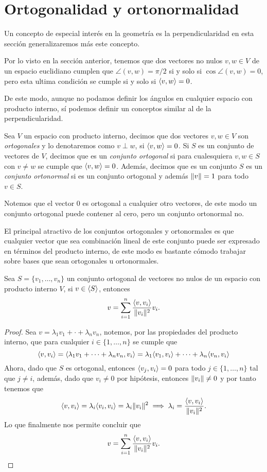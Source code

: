 \section{Ortogonalidad y ortonormalidad}

Un concepto de especial interés en la geometría es la perpendicularidad en esta sección generalizaremos más este concepto.

Por lo visto en la sección anterior, tenemos que dos vectores no nulos $v,w \in V$ de un espacio euclidiano cumplen que $\angle(v,w) = \pi/2$ si y solo si $\cos \angle(v,w) = 0$, pero esta ultima condición se cumple si y solo si $\langle v,w\rangle = 0$.

De este modo, aunque no podamos definir los ángulos en cualquier espacio con producto interno, sí podemos definir un conceptos similar al de la perpendicularidad.

\begin{defi}
  Sea $V$ un espacio con producto interno, decimos que dos vectores $v,w \in V$ son \emph{ortogonales} y lo denotaremos como $v\perp w$, si $\langle v,w\rangle = 0$. Si $S$ es un conjunto de vectores de $V$, decimos que es un \emph{conjunto ortogonal} si para cualesquiera $v,w \in S$ con $v \neq w$ se cumple que $\langle v,w\rangle = 0$. Además, decimos que es un conjunto $S$ es un \emph{conjunto ortonormal} si es un conjunto ortogonal y además $\mathopen\|v\mathclose\| = 1$ para todo $v \in S$.
\end{defi}

Notemos que el vector $0$ es ortogonal a cualquier otro vectores, de este modo un conjunto ortogonal puede contener al cero, pero un conjunto ortonormal no.

El principal atractivo de los conjuntos ortogonales y ortonormales es que cualquier vector que sea combinación lineal de este conjunto puede ser expresado en términos del producto interno, de este modo es bastante cómodo trabajar sobre bases que sean ortogonales u ortonormales.

\begin{teor} \label{teor:ExoFourier}
  Sea $S = \{v_1, \ldots, v_n\}$ un conjunto ortogonal de vectores no nulos de un espacio con producto interno $V$, si $v \in \langle S\rangle$, entonces
    \[
      v = \sum_{i=1}^n \frac{\langle v,v_i\rangle}{\mathopen\|v_i\mathclose\|^2} v_i.
    \]
\end{teor}

\begin{proof}
  Sea $v = \lambda_1 v_1 + \cdot + \lambda_n v_n$, notemos, por las propiedades del producto interno, que para cualquier $i \in \{1,\ldots,n\}$ se cumple que
  \[
    \langle v,v_i\rangle = \langle\lambda_1 v_1 + \cdots + \lambda_n v_n,v_i\rangle 
      = \lambda_1 \langle v_1,v_i\rangle + \cdots + \lambda_n \langle v_n,v_i\rangle
  \]
  Ahora, dado que $S$ es ortogonal, entonces $\langle v_j, v_i\rangle = 0$ para todo $j \in \{1,\ldots,n\}$ tal que $j \neq i$, además, dado que $v_i \neq 0$ por hipótesis, entonces $\mathopen\|v_i\mathclose\| \neq 0$ y por tanto tenemos que
  \[
    \langle v,v_i\rangle = \lambda_i \langle v_i,v_i\rangle = \lambda_i \mathopen\|v_i\mathclose\|^2 \implies \lambda_i = \frac{\langle v,v_i\rangle}{\mathopen\|v_i\mathclose\|^2}.
  \]
  Lo que finalmente nos permite concluir que 
    \[
      v = \sum_{i=1}^n \frac{\langle v,v_i\rangle}{\mathopen\|v_i\mathclose\|^2} v_i. \qedhere
    \]
\end{proof}

